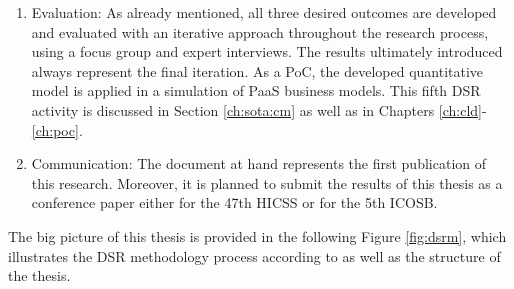 \begin{enumerate}
	\item Evaluation: As already mentioned, all three desired outcomes are developed and evaluated with an iterative approach throughout the research process, using a focus group and expert interviews. The results ultimately introduced always represent the final iteration. As a \ac{PoC}, the developed quantitative model is applied in a simulation of \ac{PaaS} business models. This fifth \ac{DSR} activity is discussed in Section \ref{ch:sota:cm} as well as in Chapters \ref{ch:cld}-\ref{ch:poc}.
	\item Communication: The document at hand represents the first publication of this research. Moreover, it is planned to submit the results of this thesis as a conference paper either for the 47th \ac{HICSS} or for the 5th \ac{ICOSB}.
\end{enumerate}

The big picture of this thesis is provided in the following Figure \ref{fig:dsrm}, which illustrates the \ac{DSR} methodology process according to \citet{Peffers2007} as well as the structure of the thesis.

\newpage


